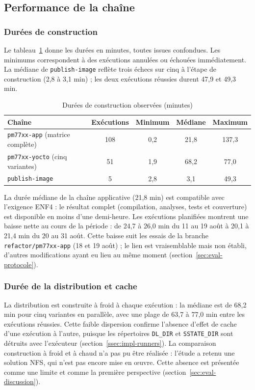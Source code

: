 \subsection{Performance de la chaîne}
\label{sec:eval-performance}

\subsubsection{Durées de construction}
Le tableau~\ref{tab:eval-durees} donne les durées en minutes, toutes issues
confondues. Les minimums correspondent à des exécutions annulées ou
échouées immédiatement. La médiane de \texttt{publish-image} reflète trois
échecs sur cinq à l'étape de construction (2,8 à 3,1 min) ; les deux
exécutions réussies durent 47,9 et 49,3 min.

\begin{table}[H]
\centering
\caption{Durées de construction observées (minutes)}
\label{tab:eval-durees}
\begin{tabular}{@{}lcccc@{}}
\toprule
\textbf{Chaîne} & \textbf{Exécutions} & \textbf{Minimum} & \textbf{Médiane} & \textbf{Maximum} \\
\midrule
\texttt{pm77xx-app} (matrice complète) & 108 & 0,2 & 21,8 & 137,3 \\
\texttt{pm77xx-yocto} (cinq variantes) & 51 & 1,9 & 68,2 & 77,0 \\
\texttt{publish-image} & 5 & 2,8 & 3,1 & 49,3 \\
\bottomrule
\end{tabular}
\end{table}

La durée médiane de la chaîne applicative (21,8 min) est compatible avec
l'exigence ENF4 : le résultat complet (compilation, analyses, tests et
couverture) est disponible en moins d'une demi-heure. Les exécutions planifiées
montrent une baisse nette au cours de la période : de 24,7 à 26,0 min du 11 au
19 août à 20,1 à 21,4 min du 20 au 31 août. Cette baisse suit les essais de la
branche \texttt{refactor/pm77xx-app} (18 et 19 août) ; le lien est vraisemblable
mais non établi, d'autres modifications ayant eu lieu au même moment
(section~\ref{sec:eval-protocole}).

\subsubsection{Durée de la distribution et cache}
La distribution est construite à froid à chaque exécution : la médiane est de
68,2 min pour cinq variantes en parallèle, avec une plage de 63,7 à 77,0 min
entre les exécutions réussies. Cette faible dispersion confirme l'absence d'effet de cache d'une exécution à l'autre, puisque les répertoires
\texttt{DL\_DIR} et \texttt{SSTATE\_DIR} sont détruits avec l'exécuteur
(section~\ref{ssec:impl-runners}). La comparaison construction à froid et
à chaud n'a pas pu être réalisée : l'étude a retenu une solution NFS, qui n'est
pas encore mise en œuvre. Cette absence est présentée comme une limite
et comme la première perspective (section~\ref{sec:eval-discussion}).

